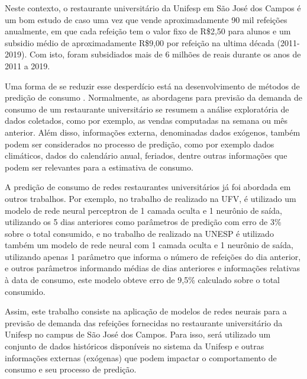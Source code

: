 Neste contexto, o restaurante universitário da Unifesp em São José dos Campos é um bom estudo de caso uma vez que vende aproximadamente 90 mil refeições anualmente, em que cada refeição tem o valor fixo de R\$2,50 para alunos e um subsidio médio de aproximadamente R\$9,00 por refeição na ultima década (2011-2019). Com isto, foram subsidiados mais de 6 milhões de reais durante os anos de 2011 a 2019.

Uma forma de se reduzir esse desperdício está na desenvolvimento de métodos de predição de consumo \cite{Lopes2008,Rocha2011}. Normalmente, as abordagens para previsão da demanda de consumo de um restaurante universitário se resumem a análise exploratória de dados coletados, como por exemplo, as vendas computadas na semana ou mês anterior. Além disso, informações externa, denominadas dados exógenos, também podem ser considerados no processo de predição, como por exemplo dados climáticos, dados do calendário anual, feriados, dentre outras informações que podem ser relevantes para a estimativa de consumo.

A predição de consumo de redes restaurantes universitários já foi abordada em outros trabalhos. Por exemplo, no trabalho de  realizado na UFV, é utilizado um modelo de rede neural perceptron de 1 camada oculta e 1 neurônio de saída, utilizando os 5 dias anteriores como parâmetros de predição com erro de 3\% sobre o total consumido, e no trabalho de  realizado na UNESP é utilizado também um modelo de rede neural com 1 camada oculta e 1 neurônio de saída, utilizando apenas 1 parâmetro que informa o número de refeições do dia anterior, e outros parâmetros informando médias de dias anteriores e informações relativas à data de consumo, este modelo obteve erro de 9,5\% calculado sobre o total consumido.

Assim, este trabalho consiste na aplicação de modelos de redes neurais para a previsão de demanda das refeições fornecidas no restaurante universitário da Unifesp no campus de São José dos Campos. Para isso, será utilizado um conjunto de dados históricos disponíveis no sistema da Unifesp e outras informações externas (exógenas) que podem impactar o comportamento de consumo e seu processo de predição.

